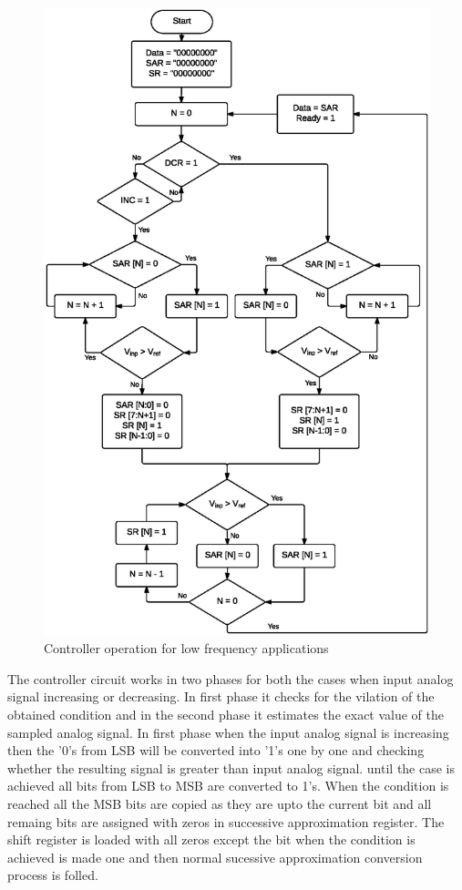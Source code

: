 \begin{figure}[H]
	\begin{center}
		\includegraphics[width=9.8 cm, angle=360]{./Figures/LFA.ps}
		\caption{Controller operation for low frequency applications}
		\label{fig:LFA}
	\end{center}
\end{figure}

\par
\hspace{0.6cm} The controller circuit works in two phases for both the cases when input analog signal increasing or decreasing. In first phase it checks for the vilation of the obtained condition and in the second phase it estimates the exact value of the sampled analog signal. In first phase when the input analog signal is increasing then the '0's from LSB will be converted into '1's one by one and checking whether the resulting signal is greater than input analog signal. until the case is achieved all bits from LSB to MSB are converted to 1's. When the condition is reached all the MSB bits are copied as they are upto the current bit and all remaing bits are assigned with zeros in successive approximation register. The shift register is loaded with all zeros except the bit when the condition is achieved is made one and then normal sucessive approximation conversion process is folled. 

